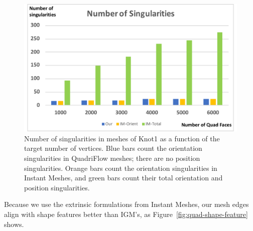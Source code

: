\begin{figure}
\centering
\includegraphics[width=0.6\linewidth]{quadriflow/diagram/numsing.pdf}

\caption{Number of singularities in meshes of Knot1 as a function of the target number of vertices. Blue bars count the orientation singularities in QuadriFlow meshes; there are no position singularities. Orange bars count the orientation singularities in Instant Meshes, and green bars count their total orientation and position singularities.}
\label{fig:quad-singularity}
\end{figure}

Because we use the extrinsic formulations from Instant Meshes, our mesh edges align with shape features better than IGM's, as Figure~\ref{fig:quad-shape-feature} shows.

